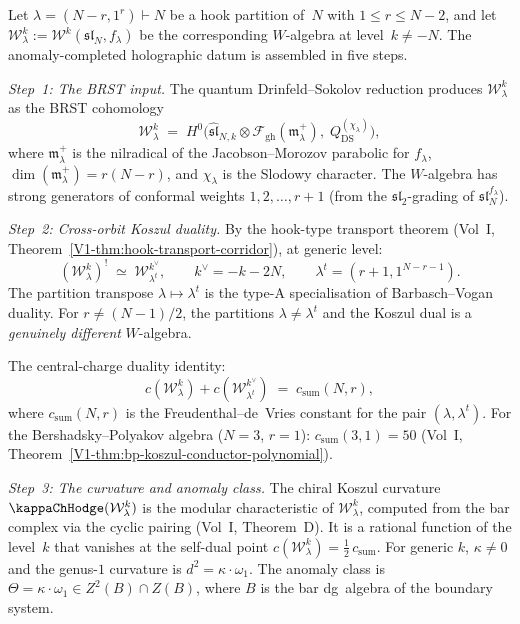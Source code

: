 \begin{construction}
Let $\lambda=(N{-}r,1^r)\vdash N$ be a hook partition of~$N$
with $1\le r\le N{-}2$, and let $\mathcal W_\lambda^k
:= \mathcal W^k(\mathfrak{sl}_N,f_\lambda)$ be the corresponding
$W$-algebra at level~$k\neq -N$. The anomaly-completed
holographic datum is assembled in five steps.

\emph{Step~1: The BRST input.}
The quantum Drinfeld--Sokolov reduction produces
$\mathcal W_\lambda^k$ as the BRST cohomology
\[
\mathcal W_\lambda^k
\;=\;
H^0\!\bigl(
\widehat{\mathfrak{sl}}_{N,k}
\otimes
\mathcal F_{\mathrm{gh}}(\mathfrak m^+_\lambda),\;
Q_{\mathrm{DS}}^{(\chi_\lambda)}
\bigr),
\]
where $\mathfrak m^+_\lambda$ is the nilradical of the
Jacobson--Morozov parabolic for $f_\lambda$,
$\dim(\mathfrak m^+_\lambda)=r(N{-}r)$, and $\chi_\lambda$
is the Slodowy character. The $W$-algebra has strong generators
of conformal weights $1,2,\dots,r{+}1$ (from the
$\mathfrak{sl}_2$-grading of
$\mathfrak{sl}_N^{f_\lambda}$).

\emph{Step~2: Cross-orbit Koszul duality.}
By the hook-type transport theorem
(Vol~I, Theorem~\ref*{V1-thm:hook-transport-corridor}),
at generic level:
\begin{equation}%
(\mathcal W_\lambda^k)^!
\;\simeq\;
\mathcal W_{\lambda^t}^{k^\vee},
\qquad
k^\vee=-k-2N,
\qquad
\lambda^t=(r{+}1,1^{N{-}r{-}1}).
\end{equation}
The partition transpose $\lambda\mapsto\lambda^t$ is the type-A
specialisation of Barbasch--Vogan duality. For $r\neq(N{-}1)/2$,
the partitions $\lambda\neq\lambda^t$ and the Koszul dual is a
\emph{genuinely different} $W$-algebra.

The central-charge duality identity:
\begin{equation}%
c(\mathcal W_\lambda^k)
+c(\mathcal W_{\lambda^t}^{k^\vee})
\;=\;
c_{\mathrm{sum}}(N,r),
\end{equation}
where $c_{\mathrm{sum}}(N,r)$ is the Freudenthal--de~Vries
constant for the pair $(\lambda,\lambda^t)$. For the
Bershadsky--Polyakov algebra ($N=3$, $r=1$):
$c_{\mathrm{sum}}(3,1)=50$
(Vol~I, Theorem~\ref*{V1-thm:bp-koszul-conductor-polynomial}).

\emph{Step~3: The curvature and anomaly class.}
The chiral Koszul curvature $\kappaChHodge(\mathcal W_\lambda^k)$ is
the modular characteristic of $\mathcal W_\lambda^k$,
computed from the bar complex via the cyclic pairing
(Vol~I, Theorem~D). It is a rational function of the
level~$k$ that vanishes at the self-dual point
$c(\mathcal W_\lambda^k)=\tfrac{1}{2}\,c_{\mathrm{sum}}$.
For generic $k$,
$\kappa\neq 0$ and the genus-$1$ curvature is
$d^2=\kappa\cdot\omega_1$. The anomaly class is
$\Theta=\kappa\cdot\omega_1\in Z^2(B)\cap Z(B)$, where $B$
is the bar dg~algebra of the boundary system.


\end{construction}

